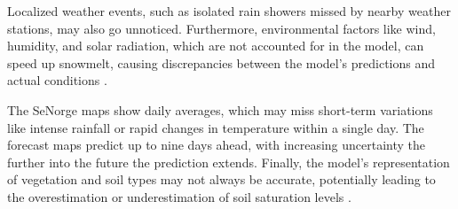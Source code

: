 Localized weather events, such as isolated rain showers missed by nearby weather stations, may also go unnoticed. Furthermore, environmental factors like wind, humidity, and solar radiation, which are not accounted for in the model, can speed up snowmelt, causing discrepancies between the model’s predictions and actual conditions \cite{senorge_watermap}.

The SeNorge maps show daily averages, which may miss short-term variations like intense rainfall or rapid changes in temperature within a single day. The forecast maps predict up to nine days ahead, with increasing uncertainty the further into the future the prediction extends. Finally, the model's representation of vegetation and soil types may not always be accurate, potentially leading to the overestimation or underestimation of soil saturation levels \cite{senorge_watermap}.